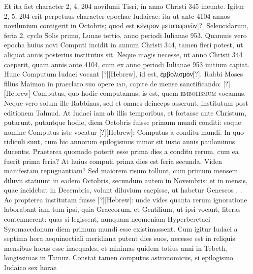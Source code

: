 Et ita fiet character 2, 4, 204 novilunii
Tisri, in anno Christi 345 ineunte.
Igitur 2, 5, 204 erit perpetuus character
epochae Iudaicae: ita ut ante 4104 annos novilunium contigerit
in  Octobris; quod est \textgreek{κέντρον μετοπωρινὸν[?]}
 Seleucidarum, feria 2,
cyclo Solis primo, Lunae tertio, anno periodi Iulianae 953.
Quamuis
vero epocha huius novi Computi incidit in annum Christi 344, tamen
fieri potest, ut aliquot annis posterius institutus sit.
Neque magis necesse,
ut anno Christi 344 caeperit, quam annis ante 4104, cum ex anno
periodi Iulianae 953 initium capiat.
Hunc Computum Iudaei vocant
\texthebrew{[?]}[Hebrew], id est, \textgreek{ἐμβολισμόν[?]}.
Rabbi Moses filius Maimon in praeclaro suo
opere \textsc{iad}, capite de mense sanctificando:
\texthebrew{[?]}[Hebrew] Computus, quo hodie computamus,
 is est, quem \textsc{embolismum}
vocamus.
Neque vero solum ille Rabbinus, sed et omnes
deinceps asserunt, institutum post editionem Talmud.
At Iudaei iam
ab illis temporibus, et fortasse ante Christum, putarunt, putantque
hodie, diem  Octobris fuisse primum mundi conditi: eoque nomine
Computus iste vocatur \texthebrew{[?]}[Hebrew]:
Computus a conditu mundi.
In quo ridiculi sunt, cum hic annorum epilogismus minor
sit iusto annis paulominus ducentis.
Praeterea quomodo poterit
esse prima dies a conditu rerum, cum ea fuerit prima feria?
At huius
computi prima dies est feria secunda.
Viden manifestam repugnantiam?
Sed maiorem risum tollunt, cum primum mensem diluvii
statuunt in eadem  Octobris, secundum autem in  Novembris:
et in  mensis, quae incidebat in  Decembris, volunt
diluvium caepisse, ut habetur Geneseos , .
Ac propterea institutam
fuisse \texthebrew{[?]}[Hebrew]: unde vides quanta rerum ignoratione laborabant
iam tum ipsi, quia Graecorum, et Gentilium, ut ipsi vocant, literas
contemnerent: quas si legissent, nunquam neomeniam Hyperberetaei
Syromacedonum diem primum mundi esse existimassent.
Cum igitur Iudaei a septima hora aequinoctiali meridiana putent dies
suos, necesse est in reliquis mensibus horas esse inaequales, et minimas
quidem totius anni in Tebeth, longissimas in Tamuz.
Constat
tamen computus astronomicus, si epilogismo Iudaico sex horae
